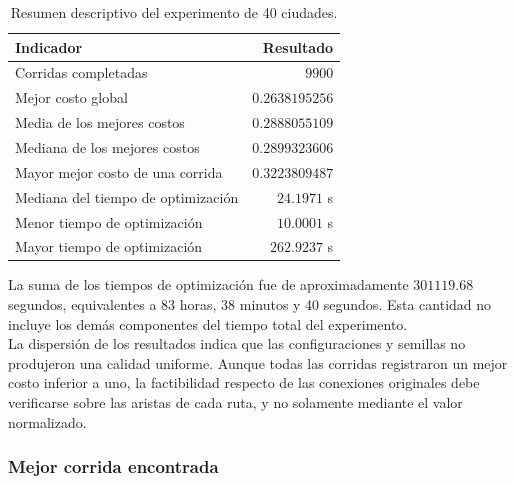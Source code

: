 \documentclass[12pt]{article}
\begin{document}
\begin{table}[htbp]
    \centering
    \begin{tabular}{lr}
        \hline
        Indicador & Resultado \\
        \hline
        Corridas completadas & $9900$ \\
        Mejor costo global & $0.2638195256$ \\
        Media de los mejores costos & $0.2888055109$ \\
        Mediana de los mejores costos & $0.2899323606$ \\
        Mayor mejor costo de una corrida & $0.3223809487$ \\
        Mediana del tiempo de optimización & $24.1971$ s \\
        Menor tiempo de optimización & $10.0001$ s \\
        Mayor tiempo de optimización & $262.9237$ s \\
        \hline
    \end{tabular}
    \caption{Resumen descriptivo del experimento de 40 ciudades.}
    \label{tab:resumen40}
\end{table}

La suma de los tiempos de optimización fue de aproximadamente
$301119.68$ segundos, equivalentes a 83 horas, 38 minutos y
40 segundos. Esta cantidad no incluye los demás componentes del
tiempo total del experimento.
\\
La dispersión de los resultados indica que las configuraciones y
semillas no produjeron una calidad uniforme. Aunque todas las corridas
registraron un mejor costo inferior a uno, la factibilidad respecto
de las conexiones originales debe verificarse sobre las aristas de
cada ruta, y no solamente mediante el valor normalizado.

\subsubsection{Mejor corrida encontrada}
\end{document}
